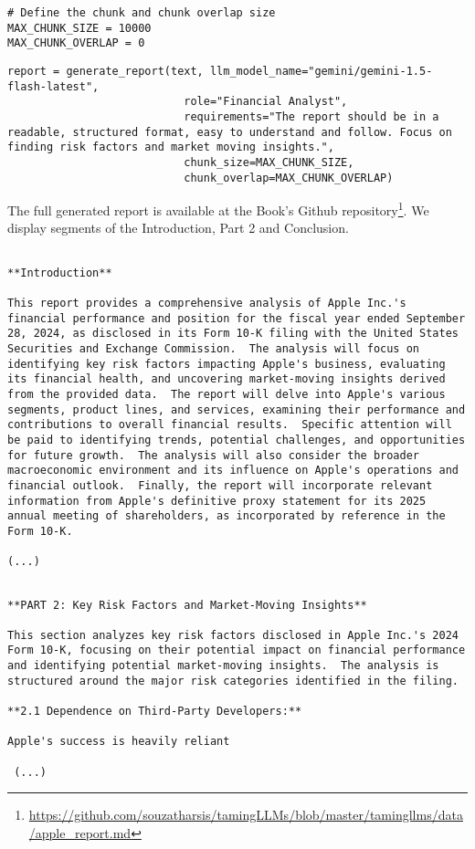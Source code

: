 \begin{verbatim}
# Define the chunk and chunk overlap size
MAX_CHUNK_SIZE = 10000
MAX_CHUNK_OVERLAP = 0
\end{verbatim}

\begin{verbatim}
report = generate_report(text, llm_model_name="gemini/gemini-1.5-flash-latest", 
                           role="Financial Analyst", 
                           requirements="The report should be in a readable, structured format, easy to understand and follow. Focus on finding risk factors and market moving insights.",
                           chunk_size=MAX_CHUNK_SIZE, 
                           chunk_overlap=MAX_CHUNK_OVERLAP)
\end{verbatim}

The full generated report is available at the Book's Github repository\footnote{\url{https://github.com/souzatharsis/tamingLLMs/blob/master/tamingllms/data/apple_report.md}}. We display segments of the Introduction, Part 2 and Conclusion.

\begin{verbatim}

**Introduction**

This report provides a comprehensive analysis of Apple Inc.'s financial performance and position for the fiscal year ended September 28, 2024, as disclosed in its Form 10-K filing with the United States Securities and Exchange Commission.  The analysis will focus on identifying key risk factors impacting Apple's business, evaluating its financial health, and uncovering market-moving insights derived from the provided data.  The report will delve into Apple's various segments, product lines, and services, examining their performance and contributions to overall financial results.  Specific attention will be paid to identifying trends, potential challenges, and opportunities for future growth.  The analysis will also consider the broader macroeconomic environment and its influence on Apple's operations and financial outlook.  Finally, the report will incorporate relevant information from Apple's definitive proxy statement for its 2025 annual meeting of shareholders, as incorporated by reference in the Form 10-K.

(...)
\end{verbatim}


\begin{verbatim}

**PART 2: Key Risk Factors and Market-Moving Insights**

This section analyzes key risk factors disclosed in Apple Inc.'s 2024 Form 10-K, focusing on their potential impact on financial performance and identifying potential market-moving insights.  The analysis is structured around the major risk categories identified in the filing.

**2.1 Dependence on Third-Party Developers:**

Apple's success is heavily reliant 

 (...) 

\end{verbatim}



